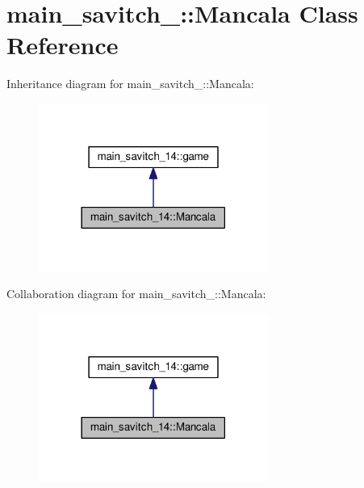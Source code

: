 \hypertarget{classmain__savitch__14_1_1Mancala}{}\section{main\+\_\+savitch\+\_\+:\+:Mancala Class Reference}
\label{classmain__savitch__14_1_1Mancala}


Inheritance diagram for main\+\_\+savitch\+\_\+:\+:Mancala\+:
\nopagebreak
\begin{figure}[H]
\begin{center}
\leavevmode
\includegraphics[width=213pt]{classmain__savitch__14_1_1Mancala__inherit__graph}
\end{center}
\end{figure}


Collaboration diagram for main\+\_\+savitch\+\_\+:\+:Mancala\+:
\nopagebreak
\begin{figure}[H]
\begin{center}
\leavevmode
\includegraphics[width=213pt]{classmain__savitch__14_1_1Mancala__coll__graph}
\end{center}
\end{figure}
